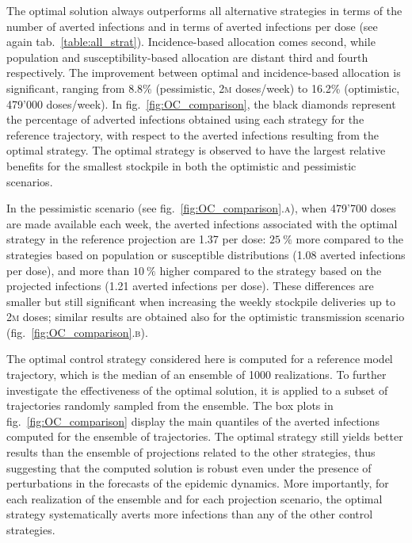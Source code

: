 The optimal solution always outperforms all alternative strategies in terms of the number of averted infections and in terms of averted infections per dose (see again tab.~\ref{table:all_strat}). Incidence-based allocation comes second, while population and susceptibility-based allocation are distant third and fourth respectively. The improvement between optimal and incidence-based allocation is significant, ranging from 8.8\% (pessimistic, 2\textsc{m} doses/week) to 16.2\% (optimistic, 479'000 doses/week). In fig.~\ref{fig:OC_comparison}, the black diamonds represent the percentage of adverted infections obtained using each strategy for the reference trajectory, with respect to the averted infections resulting from the optimal strategy. The optimal strategy is observed to have the largest relative benefits for the smallest stockpile in both the optimistic and pessimistic scenarios. 

In the pessimistic scenario (see fig.~\ref{fig:OC_comparison}.\textsc{a}), when 479'700 doses are made available each week, the averted infections associated with the optimal strategy in the reference projection are 1.37 per dose: $25~\%$ more compared to the strategies based on population or susceptible distributions (1.08 averted infections per dose), and more than $10~\%$ higher compared to the strategy based on the projected infections (1.21 averted infections per dose). These differences are smaller but still significant when increasing the weekly stockpile deliveries up to 2\textsc{m} doses; similar results are obtained also for the optimistic transmission scenario (fig.~\ref{fig:OC_comparison}.\textsc{b}). 

The optimal control strategy considered here is computed for a reference model trajectory, which is the median of an ensemble of 1000 realizations. To further investigate the effectiveness of the optimal solution, it is applied to a subset of trajectories randomly sampled from the ensemble. The box plots in fig.~\ref{fig:OC_comparison} display the main quantiles of the averted infections computed for the ensemble of trajectories. The optimal strategy still yields better results than the ensemble of projections related to the other strategies, thus suggesting that the computed solution is robust even under the presence of perturbations in the forecasts of the epidemic dynamics. More importantly, for each realization of the ensemble and for each projection scenario, the optimal strategy systematically averts more infections than any of the other control strategies.

